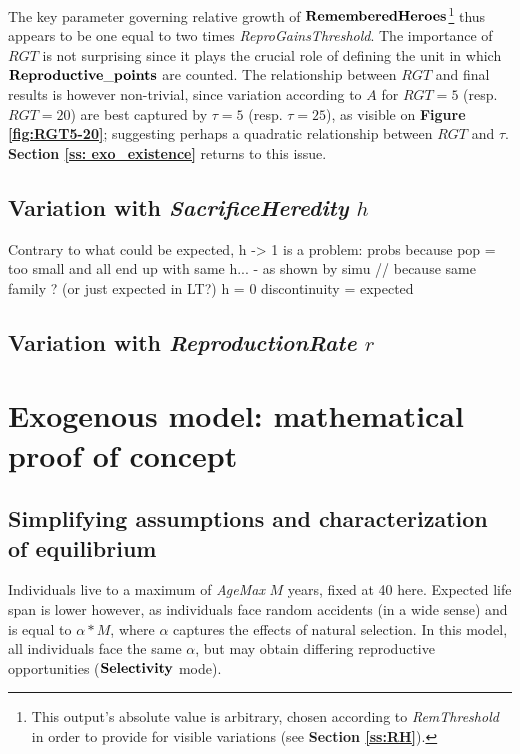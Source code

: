 \documentclass[a4paper,12pt]{report}
\begin{document}
The key parameter governing relative growth of $\bf{RememberedHeroes}$\footnote{
This output's absolute value is arbitrary, chosen according to \emph{RemThreshold} in
order to provide for visible variations (see \textbf{Section \ref{ss:RH}}).
} thus appears to be one equal to two times
\emph{ReproGainsThreshold}. The importance of $RGT$ is not surprising since it plays
the crucial role of defining the unit in which $\bf{Reproductive\_points}$ are counted.  
The relationship between $RGT$ and final results is however non-trivial, since 
variation according to $A$ for $RGT=5$ (resp. $RGT=20$) are best captured by $\tau=5$
(resp. $\tau=25$), as visible on \textbf{Figure \ref{fig:RGT5-20}}; suggesting perhaps
a quadratic relationship between $RGT$ and $\tau$. \textbf{Section \ref{ss: exo_existence}}
returns to this issue.

\subsection{Variation with \emph{SacrificeHeredity} $h$}

Contrary to what could be expected, h -> 1 is a problem: probs because pop = too small
and all end up with same h... - as shown by simu // because same family ? (or just expected in LT?)
h = 0 discontinuity = expected

\subsection{Variation with \emph{ReproductionRate} $r$}

\section{Exogenous model: mathematical proof of concept}
\label{sec_exo_math}

\subsection{Simplifying assumptions and characterization of equilibrium}
\label{ss:exm_eq}
Individuals live to a maximum of \emph{AgeMax} $M$ years, fixed at 40 here. 
 Expected life span is lower however, as individuals face random accidents
 (in a wide sense) and is equal to $\alpha*M$, where $\alpha$ captures
 the effects of natural selection. In this model, all individuals face the same $\alpha$, but
 may obtain differing reproductive opportunities ($\bf{Selectivity}$ mode).
\end{document}
